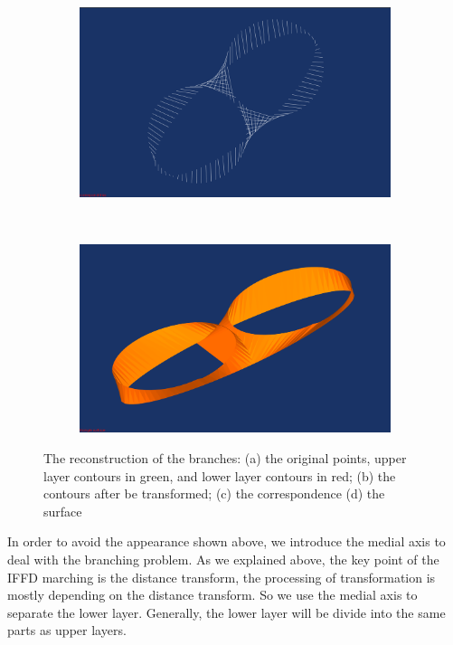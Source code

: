 \documentclass[3p,times]{elsarticle}
\begin{document}
\begin{figure}[ht]
\begin{subfigure}[b]{0.4\textwidth}
\includegraphics[width=\textwidth]{../picture/circle_ellipse_correspondence.png}
\caption{}
\label{fig:circle_ellipse_correspondence}
\end{subfigure}
~~~~~~~~~~~~~~~~~~~~~~~~~~~~~~~~~~~~
\begin{subfigure}[b]{0.4\textwidth}
\includegraphics[width=\textwidth]{../picture/circle_ellipse_surface.png}
\caption{}
\label{fig:circle_ellipse_surface}
\end{subfigure}
\caption{The reconstruction of the branches: (a) the original points,
  upper layer contours in green, and lower layer contours in red; (b)
  the contours after be transformed; (c) the correspondence (d) the
  surface}
\label{fig:branches without medial axis}
\end{figure}


In order to avoid the appearance shown above, we introduce the medial axis to deal
with the branching problem. As we explained above, the key point of
the IFFD marching is the distance transform, the processing of
transformation is mostly depending on the distance transform. So we use the
medial axis to separate the lower layer. Generally, the lower layer
will be divide into the same parts as upper layers.
\end{document}
